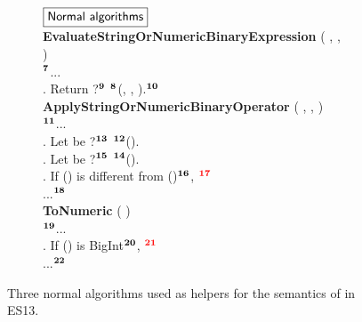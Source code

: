
\begin{figure}
  \centering
  \begin{subfigure}{\textwidth}
    \small
    $\fbox{\textsf{Normal algorithms}}$
    \vspace*{0.5em}\\
    \textbf{EvaluateStringOrNumericBinaryExpression} (
      ,
      ,
    )
    \\
    \null\quad ${}^{\textbf{7}}$...
    \\
    \null{}. Return ?${}^{\textbf{9}}$
    ${}^{\textbf{8}}$(,
    , ).${}^{\textbf{10}}$
    \vspace*{0.5em}\\
    \textbf{ApplyStringOrNumericBinaryOperator} (
      ,
      ,
    )
    \\
    \null\quad ${}^{\textbf{11}}$...
    \\
    \null{}. Let  be ?${}^{\textbf{13}}$
    ${}^{\textbf{12}}$().
    \\
    \null{}. Let  be ?${}^{\textbf{15}}$
    ${}^{\textbf{14}}$().
    \\
    \null{}. If () is different from
    ()${}^{\textbf{16}}$, ${}^{\textbf{{\color{red}{17}}}}$
    \\
    \null\quad ...${}^{\textbf{18}}$
    \vspace*{0.5em}\\
    \textbf{ToNumeric} (  )
    \\
    \null\quad ${}^{\textbf{19}}$...
    \\
    \null{}. If () is BigInt${}^{\textbf{20}}$,
    ${}^{\textbf{{\color{red}{21}}}}$
    \\
    \null\quad ...${}^{\textbf{22}}$
  \end{subfigure}
  \caption{Three normal algorithms used as helpers for the semantics of
   in ES13.}
  \label{fig:normal-algos}
  \vspace*{-1em}
\end{figure}

